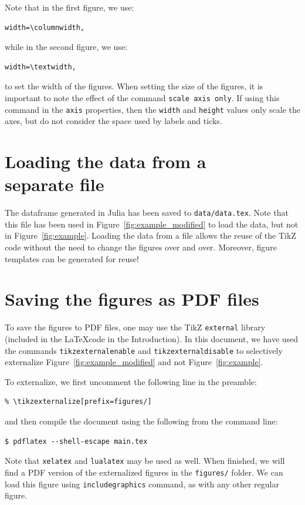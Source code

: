 \documentclass[9ptm,twocolumn]{article}
\begin{document}
Note that in the first figure, we use:
\begin{verbatim}
width=\columnwidth,	
\end{verbatim}
while in the second figure, we use:
\begin{verbatim}
width=\textwidth,	
\end{verbatim}
to set the width of the figures. When setting the size of the figures, it is important to note the effect of the command \texttt{scale axis only}. If using this command in the \texttt{axis} properties, then the \texttt{width} and \texttt{height} values only scale the axes, but do not consider the space used by labels and ticks.


\section{Loading the data from a \\separate file}
The dataframe generated in Julia has been saved to \texttt{data/data.tex}. Note that this file has been used in Figure~\ref{fig:example_modified} to load the data, but not in Figure~\ref{fig:example}. Loading the data from a file allows the reuse of the TikZ code without the need to change the figures over and over. Moreover, figure templates can be generated for reuse!

\section{Saving the figures as PDF files}
To save the figures to PDF files, one may use the TikZ \texttt{external} library (included in the \LaTeX code in the Introduction). In this document, we have used the commands \texttt{tikzexternalenable} and \texttt{tikzexternaldisable} to selectively externalize Figure~\ref{fig:example_modified} and not Figure~\ref{fig:example}.

To externalize, we first uncomment the following line in the preamble:
\begin{verbatim}
% \tikzexternalize[prefix=figures/]
\end{verbatim}
and then compile the document using the following from the command line:
\begin{verbatim}
$ pdflatex --shell-escape main.tex
\end{verbatim}
Note that \texttt{xelatex} and \texttt{lualatex} may be used as well. When finished, we will find a PDF version of the externalized figures in the \texttt{figures/} folder. We can load this figure using \texttt{includegraphics} command, as with any other regular figure.
\end{document}
